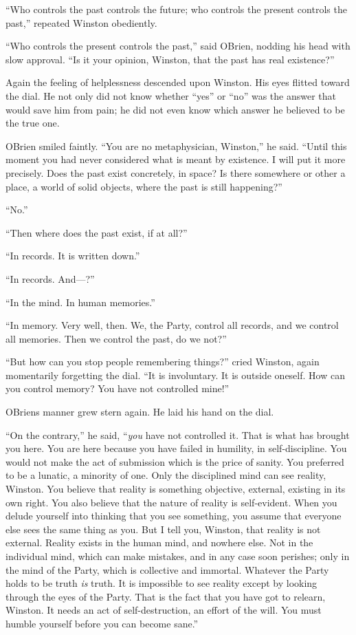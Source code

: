 ``\textquotesingle Who controls the past controls the future; who
controls the present controls the past,\textquotesingle'' repeated
Winston obediently.

``\textquotesingle Who controls the present controls the
past,\textquotesingle'' said O\textquotesingle Brien, nodding his head
with slow approval. ``Is it your opinion, Winston, that the past has real
existence?''

Again the feeling of helplessness descended upon Winston. His eyes
flitted toward the dial. He not only did not know whether ``yes'' or ``no''
was the answer that would save him from pain; he did not even know which
answer he believed to be the true one.

O\textquotesingle Brien smiled faintly. ``You are no metaphysician,
Winston,'' he said. ``Until this moment you had never considered what is
meant by existence. I will put it more precisely. Does the past exist
concretely, in space? Is there somewhere or other a place, a world of
solid objects, where the past is still happening?''

``No.''

``Then where does the past exist, if at all?''

``In records. It is written down.''

``In records. And---?''

``In the mind. In human memories.''

``In memory. Very well, then. We, the Party, control all records, and we
control all memories. Then we control the past, do we not?''

``But how can you stop people remembering things?'' cried Winston, again
momentarily forgetting the dial. ``It is involuntary. It is outside
oneself. How can you control memory? You have not controlled mine!''

O\textquotesingle Brien\textquotesingle s manner grew stern again. He
laid his hand on the dial.

``On the contrary,'' he said, ``\emph{you} have not controlled it. That is
what has brought you here. You are here because you have failed in
humility, in self-discipline. You would not make the act of submission
which is the price of sanity. You preferred to be a lunatic, a minority
of one. Only the disciplined mind can see reality, Winston. You believe
that reality is something objective, external, existing in its own
right. You also believe that the nature of reality is self-evident. When
you delude yourself into thinking that you see something, you assume
that everyone else sees the same thing as you. But I tell you, Winston,
that reality is not external. Reality exists in the human mind, and
nowhere else. Not in the individual mind, which can make mistakes, and
in any case soon perishes; only in the mind of the Party, which is
collective and immortal. Whatever the Party holds to be truth \emph{is}
truth. It is impossible to see reality except by looking through the
eyes of the Party. That is the fact that you have got to relearn,
Winston. It needs an act of self-destruction, an effort of the will. You
must humble yourself before you can become sane.''

